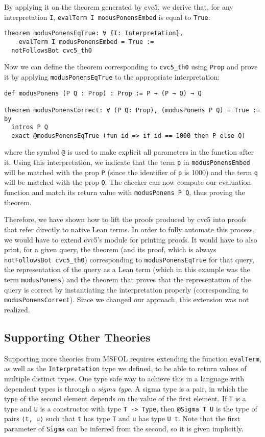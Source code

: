 By applying it on the theorem generated by cvc5, we derive that, for any
interpretation \texttt{I}, \texttt{evalTerm I modusPonensEmbed} is equal
to \texttt{True}:

\begin{verbatim}
theorem modusPonensEqTrue: ∀ {I: Interpretation},
    evalTerm I modusPonensEmbed = True :=
  notFollowsBot cvc5_th0
\end{verbatim}

Now we can define the theorem corresponding to \texttt{cvc5\_th0} using
\texttt{Prop} and prove it by applying \texttt{modusPonensEqTrue} to
the appropriate interpretation:

\begin{verbatim}
def modusPonens (P Q : Prop) : Prop := P → (P → Q) → Q

theorem modusPonensCorrect: ∀ (P Q: Prop), (modusPonens P Q) = True := by
  intros P Q
  exact @modusPonensEqTrue (fun id => if id == 1000 then P else Q)
\end{verbatim}
where the symbol \texttt{@} is used to make explicit all parameters
in the function after it. Using this interpretation, we indicate
that the term \texttt{p} in \texttt{modusPonensEmbed}
will be matched with the prop \texttt{P} (since the identifier of \texttt{p}
is 1000) and the term \texttt{q} will be matched with the prop \texttt{Q}.
The checker can now compute our evaluation function and
match its return value with \texttt{modusPonens P Q}, thus proving the theorem.

Therefore, we have shown how to lift the proofs produced by cvc5 into proofs
that refer directly to native Lean terms. In order to fully automate this
process, we would have to extend cvc5's module for printing proofs. It would
have to also print, for a given query, the theorem (and its proof, which is always
\texttt{notFollowsBot cvc5\_th0}) corresponding to \texttt{modusPonensEqTrue} for that query,
the representation of the query as a Lean term (which in this example was the term \texttt{modusPonens})
and the theorem that proves that the representation of the query is correct by instantiating the interpretation
properly (corresponding to \texttt{modusPonensCorrect}).
Since we changed our approach, this extension was not realized.

\subsection{Supporting Other Theories}

Supporting more theories from MSFOL requires extending the function \texttt{evalTerm},
as well as the \texttt{Interpretation} type we defined, to be able to return values
of multiple distinct types. One type safe way to achieve this in a language with
dependent types is through a \textit{sigma type}. A sigma type is a pair, in which
the type of the second element depends on the value of the first element. If
\texttt{T} is a type and \texttt{U} is a constructor with type
\texttt{T -> Type}, then \texttt{@Sigma T U} is the type
of pairs \texttt{⟨t, u⟩} such that \texttt{t} has type \texttt{T} and
\texttt{u} has type \texttt{U t}. Note that the first parameter of \texttt{Sigma}
can be inferred from the second, so it is given implicitly.

